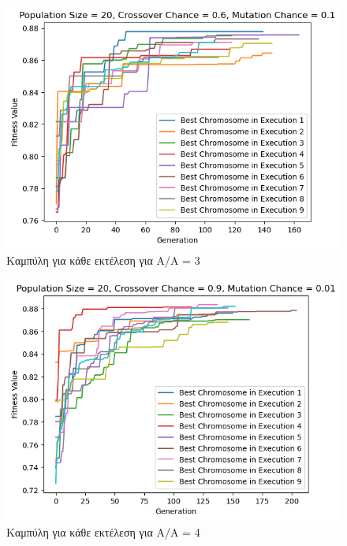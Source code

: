 \documentclass[12pt,a4paper]{article}
\begin{document}
\begin{figure}[H]
	\includegraphics[width=\textwidth]{Figures/6. All for AA = 3.png}
	\caption{Καμπύλη για κάθε εκτέλεση για A/A = 3}
\end{figure}

\begin{figure}[H]
	\includegraphics[width=\textwidth]{Figures/8. All for AA = 4.png}
	\caption{Καμπύλη για κάθε εκτέλεση για A/A = 4}
\end{figure}
\end{document}

